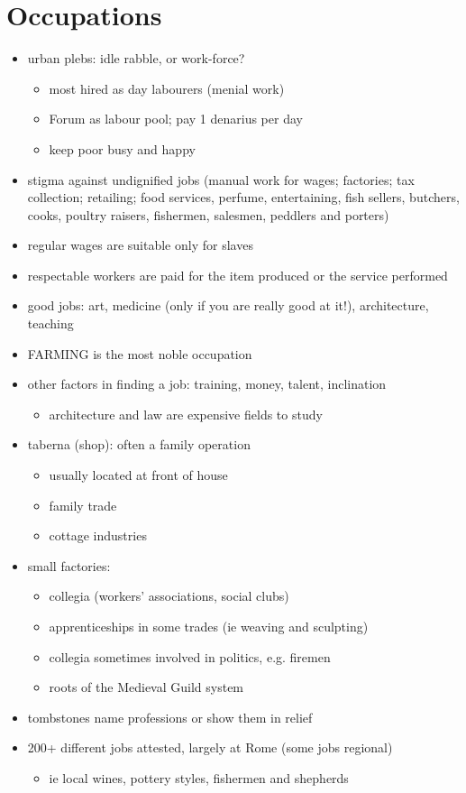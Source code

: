 \documentclass[12pt, twoside]{article}
\begin{document}
\section{Occupations}
\begin{itemize}
\item urban plebs: idle rabble, or work-force?
	\begin{itemize}
	\item most hired as day labourers (menial work)
	\item Forum as labour pool; pay 1 denarius per day
	\item keep poor busy and happy
	\end{itemize}
\item stigma against undignified jobs (manual work for wages; factories; tax collection; retailing; food services, perfume, entertaining, fish sellers, butchers, cooks, poultry raisers, fishermen, salesmen, peddlers and porters)
\item regular wages are suitable only for slaves
\item respectable workers are paid for the item produced or the service performed
\item good jobs: art, medicine (only if you are really good at it!), architecture, teaching
\item FARMING is the most noble occupation
\item other factors in finding a job: training, money, talent, inclination
	\begin{itemize}
	\item architecture and law are expensive fields to study
	\end{itemize}
\item taberna (shop): often a family operation
	\begin{itemize}
	\item usually located at front of house
	\item family trade
	\item cottage industries
	\end{itemize}
\item small factories:
	\begin{itemize}
	\item collegia (workers' associations, social clubs)
	\item apprenticeships in some trades (ie weaving and sculpting)
	\item collegia sometimes involved in politics, e.g. firemen
	\item roots of the Medieval Guild system
	\end{itemize}
\item tombstones name professions or show them in relief
\item 200+ different jobs attested, largely at Rome (some jobs regional)
	\begin{itemize}
	\item ie local wines, pottery styles, fishermen and shepherds
	\end{itemize}
\end{itemize}
\end{document}

